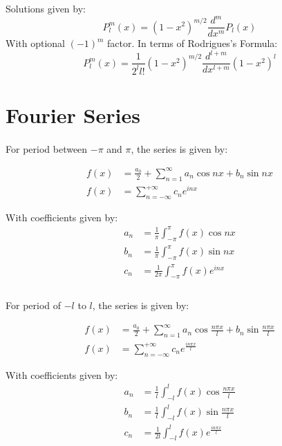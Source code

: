 \documentclass[12pt]{article}
\begin{document}
Solutions given by:
\[P^m_l(x) = (1-x^2)^{m/2}\frac{d^m}{dx^m}P_l(x)\]
With optional $(-1)^m$ factor. In terms of Rodrigues's Formula:
\[P^m_l(x) = \frac{1}{2^ll!}(1-x^2)^{m/2}\frac{d^{l+m}}{dx^{l+m}}(1-x^2)^l\]



\section{Fourier Series}

\paragraph{}
For period between $-\pi$ and $\pi$, the series is given by:

\begin{align*}
    f(x) &= \frac{a_0}{2} + \sum_{n=1}^{\infty} a_n \cos{nx} + b_n \sin{nx}\\
    f(x) &= \sum_{n=-\infty}^{+\infty} c_n e^{inx}
\end{align*}

With coefficients given by:
\begin{align*}
    a_n &= \frac{1}{\pi} \int^{\pi}_{-\pi}f(x)\cos{nx}\\
    b_n &= \frac{1}{\pi} \int^{\pi}_{-\pi}f(x)\sin{nx}\\
    c_n &= \frac{1}{2\pi} \int^{\pi}_{-\pi}f(x)e^{inx}\\
\end{align*}

\paragraph{}
For period of $-l$ to $l$, the series is given by:

\begin{align*}
    f(x) &= \frac{a_0}{2} + \sum_{n=1}^{\infty} a_n \cos{\frac{n\pi x}{l}} + b_n \sin{\frac{n\pi x}{l}}\\
    f(x) &= \sum_{n=-\infty}^{+\infty} c_n e^{\frac{in\pi x}{l}}
\end{align*}

With coefficients given by:
\begin{align*}
    a_n &= \frac{1}{l} \int^{l}_{-l}f(x)\cos{\frac{n\pi x}{l}}\\
    b_n &= \frac{1}{l} \int^{l}_{-l}f(x)\sin{\frac{n\pi x}{l}}\\
    c_n &= \frac{1}{2l} \int^{l}_{-l}f(x)e^{\frac{in\pi x}{l}}\\
\end{align*}
\end{document}
